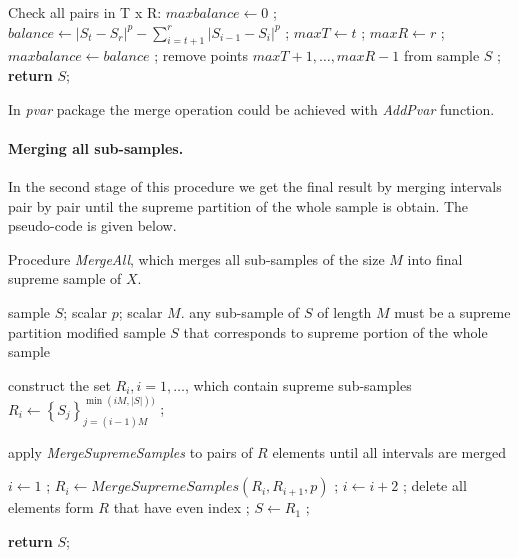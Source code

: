 \documentclass[12pt, a4paper]{article}
\def\lc{\left\lceil}
\def\rc{\right\rceil}
\numberwithin{equation}{section}
\begin{document}
\begin{algorithm}[H]                     
\begin{algorithmic} [1]                

\item[] \Comment Check all pairs in T x R:
\State $maxbalance \leftarrow 0$ ; 
    \State $balance \leftarrow |S_t - S_r|^p - \sum_{i=t+1}^r |S_{i-1}-S_i|^p$ ;
        \State $maxT \leftarrow t$ ;
      	\State $maxR \leftarrow r$ ;
        \State $maxbalance \leftarrow balance$ ;
      \EndIf
  \EndFor      
\EndFor
{}
  \State remove points $maxT+1, \dots, maxR-1$ from sample $S$ ;
\EndIf
\State \textbf{return} $S$;
\EndFunction
\end{algorithmic}
\end{algorithm}

In \emph{pvar} package the merge
operation could be achieved 
with \emph{AddPvar} function.

\paragraph{Merging all sub-samples.}
In the second stage of this procedure we get 
the final result by
merging intervals pair by pair 
until the supreme partition of the whole sample 
is obtain.
The pseudo-code is given below.
\begin{algorithm}[H]
\caption{Procedure \emph{MergeAll}, which merges all
sub-samples of the size $M$ into final supreme sample of $X$.}
\label{alg:MergeAll}
\begin{algorithmic}[1]
\Input sample $S$;  scalar $p$; scalar $M$.
\Require any sub-sample of $S$ of length $M$ must be a supreme partition
\Output modified sample $S$ that corresponds to supreme portion of the whole sample

\item[]\Comment construct the set $R_i, i=1,\dots$, which contain supreme sub-samples 
\For{$i \leftarrow 1$ \textbf{ to } $\lc \frac{|S|}{M}\rc$}
  \State $R_i \leftarrow 
    \left\{ S_j \right\}_{j=(i-1)M}^{\min(iM, |S|))}$ ;
\EndFor
\item[]
\item[] \Comment apply \emph{MergeSupremeSamples} 
to pairs of $R$ elements until 
all intervals are merged

\State $i \leftarrow 1$ ;
    \State $R_i \leftarrow MergeSupremeSamples(R_i, R_{i+1}, p) $ ;
    \State $i \leftarrow i+2$ ;  
  \EndWhile
  \State delete all elements form $R$ that have even index ;
\EndWhile
\State $S \leftarrow R_1 $ ;

\State \textbf{return} $S$;
\EndFunction
\end{algorithmic}
\end{algorithm}
\end{document}
